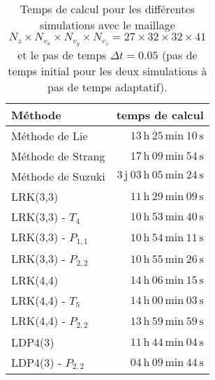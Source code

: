 \begin{table}[h]
  \centering
  \begin{tabular}{l|r}
    Méthode & temps de calcul \\
    \hline
    Méthode de Lie       &                $13\,\textrm{h}\ 25\,\textrm{min}\ 10\,\textrm{s}$ \\
    Méthode de Strang    &                $17\,\textrm{h}\ 09\,\textrm{min}\ 54\,\textrm{s}$ \\
    Méthode de Suzuki    & $3\,\textrm{j}\ 03\,\textrm{h}\ 05\,\textrm{min}\ 24\,\textrm{s}$ \\
    \hline
    LRK(3,3)             &                $11\,\textrm{h}\ 29\,\textrm{min}\ 09\,\textrm{s}$ \\
    LRK(3,3) - $T_4$     &                $10\,\textrm{h}\ 53\,\textrm{min}\ 40\,\textrm{s}$ \\
    LRK(3,3) - $P_{1,1}$ &                $10\,\textrm{h}\ 54\,\textrm{min}\ 11\,\textrm{s}$ \\
    LRK(3,3) - $P_{2,2}$ &                $10\,\textrm{h}\ 55\,\textrm{min}\ 26\,\textrm{s}$ \\
    \hline
    LRK(4,4)             &                $14\,\textrm{h}\ 06\,\textrm{min}\ 15\,\textrm{s}$ \\
    LRK(4,4) - $T_5$     &                $14\,\textrm{h}\ 00\,\textrm{min}\ 03\,\textrm{s}$ \\
    LRK(4,4) - $P_{2,2}$ &                $13\,\textrm{h}\ 59\,\textrm{min}\ 59\,\textrm{s}$ \\
    \hline
    LDP4(3)              &                $11\,\textrm{h}\ 44\,\textrm{min}\ 04\,\textrm{s}$ \\
    LDP4(3) - $P_{2,2}$  &                $04\,\textrm{h}\ 09\,\textrm{min}\ 44\,\textrm{s}$ \\
  \end{tabular}
  \caption{Temps de calcul pour les différentes simulations avec le maillage $N_z \times N_{v_x} \times N_{v_y} \times N_{v_z}=27\times32\times32\times41$ et le pas de temps $\Delta t = 0.05$ (pas de temps initial pour les deux simulations à pas de temps adaptatif).}
  \label{tab:3:computing:time}
\end{table}

